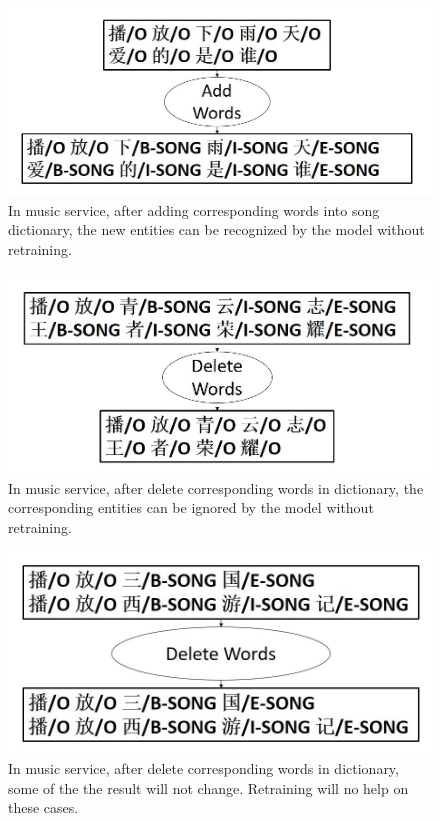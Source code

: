 \documentclass[letterpaper]{article} %
\begin{document}
\begin{figure}[t]
\centering
\includegraphics[width=0.9\columnwidth]{change_after_adding_song} %
\caption{In music service, after adding corresponding words into song dictionary, the new entities can be recognized by the model without retraining.}
\label{fig3}
\end{figure}

\begin{figure}[t]
\centering
\includegraphics[width=0.85\columnwidth]{change_after_delete_song} %
\caption{In music service, after delete corresponding words in dictionary, the corresponding entities can be ignored by the model without retraining.}
\label{fig4}
\end{figure}

\begin{figure}[t]
\centering
\includegraphics[width=0.85\columnwidth]{no_change_after_delete_song} %
\caption{In music service, after delete corresponding words in dictionary, some of the the result will not change. Retraining will no help on these cases.}
\label{fig5}
\end{figure}
\end{document}
